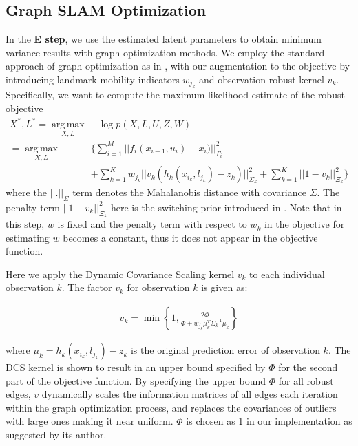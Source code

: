 \subsection{Graph SLAM Optimization}

In the \textbf{E step}, we use the estimated latent parameters to obtain minimum variance results with graph optimization methods. We employ the standard approach of graph optimization as in \cite{g2o}, with our augmentation to the objective by introducing landmark mobility indicators $w_{j_k}$ and observation robust kernel $v_k$. Specifically, we want to compute the maximum likelihood estimate of the robust objective
\begin{equation}
\begin{aligned}
X^*, L^* = \operatorname*{arg\,max}_{X, L} & -\log p(X, L, U, Z, W)\\
=\operatorname*{arg\,max}_{X, L} & \{ \sum_{i=1}^M||f_i(x_{i-1}, u_i) - x_i)||^2_{\Gamma_i} \\
&+ \sum_{k=1}^K w_{j_k}|| v_k (h_k(x_{i_k}, l_{j_k}) - z_k)||^2_{\Sigma_k} + \sum_{k=1}^K ||1 - v_k||^2_{\Xi_k} \}
\end{aligned}
\label{eq:MAP}
\end{equation}
where the $||.||_\Sigma$ term denotes the Mahalanobis distance with covariance $\Sigma$. The penalty term $|| 1 - v_k||^2_{\Xi_k}$ here is the switching prior introduced in \cite{Switchable12}. Note that in this step, $w$ is fixed and the penalty term with respect to $w_k$ in the objective for estimating $w$ becomes a constant, thus it does not appear in the objective function.

Here we apply the Dynamic Covariance Scaling\cite{DCS} kernel $v_k$ to each individual observation $k$. The factor $v_k$ for observation $k$ is given as:

\begin{equation}
\begin{aligned}
v_k = \min \left\{ 1, \frac{2\Phi}{\Phi + w_{j_k}\mu_k^T \Sigma_k^{-1} \mu_k}\right\}
\end{aligned}
\label{eq:DCS}
\end{equation}

where $\mu_k = h_k(x_{i_k}, l_{j_k}) - z_k$ is the original prediction error of observation $k$. The DCS kernel is shown to result in an upper bound specified by $\Phi$ for the second part of the objective function. By specifying the upper bound $\Phi$ for all robust edges, $v$ dynamically scales the information matrices of all edges each iteration within the graph optimization process, and replaces the covariances of outliers with large ones making it near uniform. $\Phi$ is chosen as 1 in our implementation as suggested by its author. 

